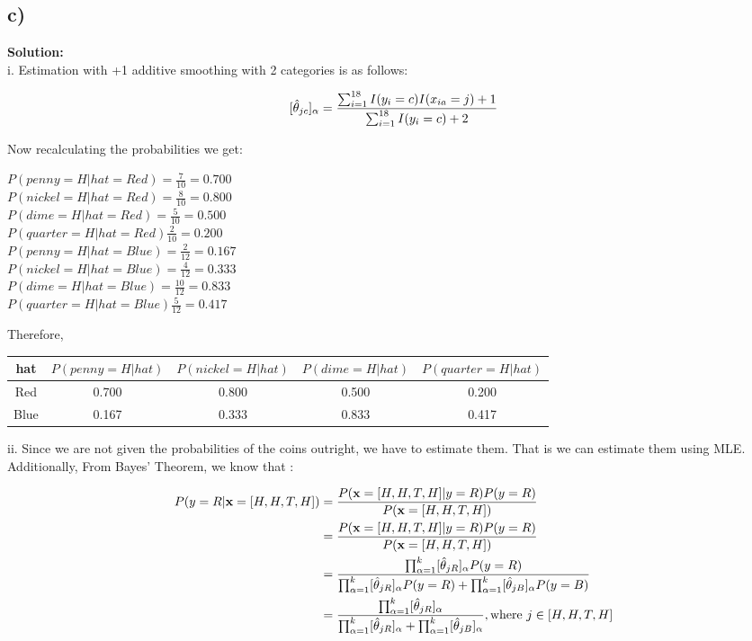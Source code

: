 \documentclass[a4paper]{article}
\begin{document}
\subsection*{c)}



\textbf{Solution:} \\
i. Estimation with +1 additive smoothing with 2 categories is as follows:

$$[\Hat{\theta}_{jc}]_{\alpha} = \frac{\sum_{i = 1}^{18}I(y_i = c)I(x_{ia} = j) + 1}{\sum_{i=1}^{18}I(y_i = c) + 2}$$

Now recalculating the probabilities we get:


\begin{center}
$P(penny=H|hat=Red) = \frac{7}{10} = 0.700$ \\ 
$P(nickel=H|hat=Red)= \frac{8}{10} = 0.800$  \\
$P(dime=H|hat=Red)= \frac{5}{10} = 0.500$   \\ 
$P(quarter=H|hat=Red) \frac{2}{10} = 0.200$\\
$P(penny=H|hat=Blue) = \frac{2}{12} = 0.167$ \\ 
$P(nickel=H|hat=Blue)= \frac{4}{12} = 0.333$  \\
$P(dime=H|hat=Blue)= \frac{10}{12} = 0.833$   \\ 
$P(quarter=H|hat=Blue) \frac{5}{12} = 0.417$\\
\end{center}

Therefore,
\begin{center}
	\begin{tabular}{ | c || c|  c|  c | c |}
		\hline
		hat &  $P(penny=H|hat)$ & $P(nickel=H|hat)$ & $P(dime=H|hat)$ & $P(quarter=H|hat)$  \\ 
		\hline
		\hline
		Red    &  0.700 &0.800  &0.500 & 0.200 \\
		\hline
		Blue    & 0.167 & 0.333  &0.833  &0.417  \\
		\hline
	\end{tabular}
\end{center}
ii. Since we are not given the probabilities of the coins outright, we have to estimate them. That is we can estimate them using MLE. Additionally, From Bayes' Theorem, we know that :


\begin{align*}
    P(y = R|\textbf{x} = [H,H,T,H]) &= \frac{P(\textbf{x} = [H,H,T,H] | y = R) P(y=R)}{P(\textbf{x} = [H,H,T,H])} \\
     &= \frac{P(\textbf{x} = [H,H,T,H] | y = R) P(y=R)}{P(\textbf{x} = [H,H,T,H])} \\
    &= \frac{\prod_{\alpha = 1}^{k}[\Hat{\theta}_{jR}]_{\alpha}P(y = R)}{\prod_{\alpha = 1}^{k}[\Hat{\theta}_{jR}]_{\alpha}P(y=R) + \prod_{\alpha = 1}^{k}[\Hat{\theta}_{jB}]_{\alpha}P(y=B)} \\
    &= \frac{\prod_{\alpha = 1}^{k}[\Hat{\theta}_{jR}]_{\alpha}}{\prod_{\alpha = 1}^{k}[\Hat{\theta}_{jR}]_{\alpha} + \prod_{\alpha = 1}^{k}[\Hat{\theta}_{jB}]_{\alpha}}, \text{where $j \in [H,H,T,H]$}
\end{align*}
\end{document}
